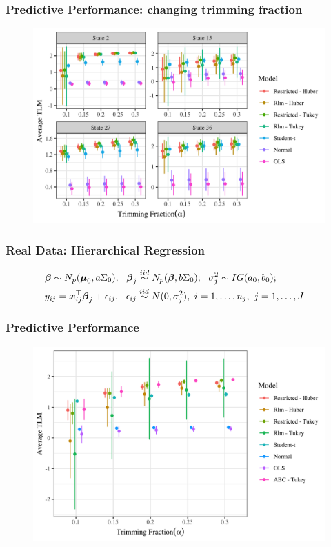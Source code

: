 \documentclass{beamer}
\def\bbeta{\mbox{\boldmath $\beta$}}
\def\bmu{\mbox{\boldmath $\mu$}}
\newcommand{\bx}{\mbox{\boldmath $x$}}
\newcommand{\iid}{\stackrel{iid}{\sim}}
\begin{document}
\begin{frame}
	\frametitle{Predictive Performance: changing trimming fraction}
	
\begin{figure}[t]
	\centering
	\includegraphics[width=4.5in]{tlm_base_Student-tbyTrimming.png}
	\label{fig:tlmbyAlpha}
\end{figure}

	
\end{frame}


\begin{frame}
\frametitle{Real Data: Hierarchical Regression}
\begin{align*}
\label{eq:hierModel}
&\bbeta\sim N_p(\bmu_0, a\Sigma_0);\ \ 
\bbeta_j\iid N_p(\bbeta, b\Sigma_0); \ \  
\sigma_j^2\sim IG(a_0,b_0);  & \\ 
& y_{ij}=\bx_{ij}^\top\bbeta_j+\epsilon_{ij},\ \ \epsilon_{ij}\iid N(0, \sigma_j^2),\ i=1,\dots, n_j,\ j=1,\dots, J &
\end{align*}	
\end{frame}

\begin{frame}
	\frametitle{Predictive Performance}
\begin{figure}[t]
	\centering
	\includegraphics[width=4.5in]{hier_average_tlm.png}
	\label{fig:hierTLM}
\end{figure}
\end{frame}
\end{document}

